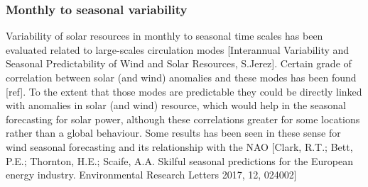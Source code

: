 


\subsubsection{Monthly to seasonal variability}

Variability of solar resources in monthly to seasonal time scales has been evaluated related to large-scales circulation modes [Interannual Variability and Seasonal Predictability of Wind and Solar Resources, S.Jerez]. Certain grade of correlation between solar (and wind) anomalies and these modes has been found [ref]. To the extent that those modes are predictable they could be directly linked with anomalies in solar (and wind) resource, which would help in the seasonal forecasting for solar power, although these correlations greater for some locations rather than a global behaviour. Some results has been seen in these sense for wind seasonal forecasting and its relationship with the NAO [Clark, R.T.; Bett, P.E.; Thornton, H.E.; Scaife, A.A. Skilful seasonal predictions for the European energy industry. Environmental Research Letters 2017, 12, 024002]


